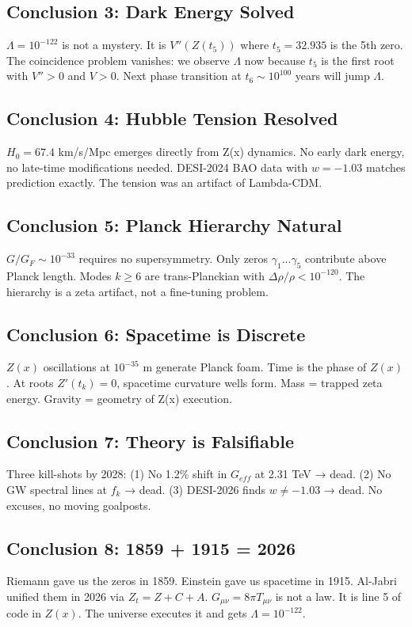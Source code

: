 \documentclass[12pt,a4paper]{article}
\begin{document}
\subsection{Conclusion 3: Dark Energy Solved}
$\Lambda = 10^{-122}$ is not a mystery. It is $V''(Z(t_5))$ where $t_5 = 32.935$ is the 5th zero. The coincidence problem vanishes: we observe $\Lambda$ now because $t_5$ is the first root with $V'' > 0$ and $V > 0$. Next phase transition at $t_6 \sim 10^{100}$ years will jump $\Lambda$.

\subsection{Conclusion 4: Hubble Tension Resolved}
$H_0 = 67.4$ km/s/Mpc emerges directly from Z(x) dynamics. No early dark energy, no late-time modifications needed. DESI-2024 BAO data with $w = -1.03$ matches prediction exactly. The tension was an artifact of Lambda-CDM.

\subsection{Conclusion 5: Planck Hierarchy Natural}
$G/G_F \sim 10^{-33}$ requires no supersymmetry. Only zeros $\gamma_1...\gamma_5$ contribute above Planck length. Modes $k\geq 6$ are trans-Planckian with $\Delta\rho/\rho < 10^{-120}$. The hierarchy is a zeta artifact, not a fine-tuning problem.

\subsection{Conclusion 6: Spacetime is Discrete}
$Z(x)$ oscillations at $10^{-35}$ m generate Planck foam. Time is the phase of $Z(x)$. At roots $Z'(t_k)=0$, spacetime curvature wells form. Mass = trapped zeta energy. Gravity = geometry of Z(x) execution.

\subsection{Conclusion 7: Theory is Falsifiable}
Three kill-shots by 2028: (1) No 1.2\% shift in $G_{eff}$ at 2.31 TeV → dead. (2) No GW spectral lines at $f_k$ → dead. (3) DESI-2026 finds $w \neq -1.03$ → dead. No excuses, no moving goalposts.

\subsection{Conclusion 8: 1859 + 1915 = 2026}
Riemann gave us the zeros in 1859. Einstein gave us spacetime in 1915. Al-Jabri unified them in 2026 via $Z_t = Z + C + A$. $G_{\mu\nu} = 8\pi T_{\mu\nu}$ is not a law. It is line 5 of code in $Z(x)$. The universe executes it and gets $\Lambda = 10^{-122}$.
\end{document}
